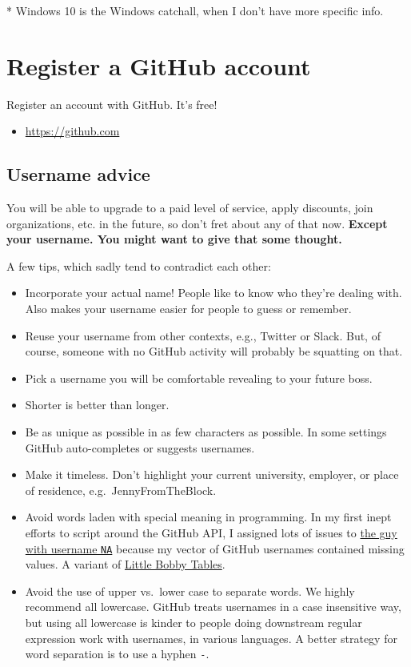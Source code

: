 \documentclass[
]{book}
\providecommand{\tightlist}{%
  \setlength{\itemsep}{0pt}\setlength{\parskip}{0pt}}
\begin{document}
* Windows 10 is the Windows catchall, when I don't have more specific info.

\chapter{Register a GitHub account}\label{github-acct}

Register an account with GitHub. It's free!

\begin{itemize}
\tightlist
\item
  \url{https://github.com}
\end{itemize}

\section{Username advice}\label{username-advice}

You will be able to upgrade to a paid level of service, apply discounts, join organizations, etc. in the future, so don't fret about any of that now. \textbf{Except your username. You might want to give that some thought.}

A few tips, which sadly tend to contradict each other:

\begin{itemize}
\tightlist
\item
  Incorporate your actual name! People like to know who they're dealing with. Also makes your username easier for people to guess or remember.
\item
  Reuse your username from other contexts, e.g., Twitter or Slack. But, of course, someone with no GitHub activity will probably be squatting on that.
\item
  Pick a username you will be comfortable revealing to your future boss.
\item
  Shorter is better than longer.
\item
  Be as unique as possible in as few characters as possible. In some settings GitHub auto-completes or suggests usernames.
\item
  Make it timeless. Don't highlight your current university, employer, or place of residence, e.g.~JennyFromTheBlock.
\item
  Avoid words laden with special meaning in programming. In my first inept efforts to script around the GitHub API, I assigned lots of issues to \href{https://github.com/na}{the guy with username \texttt{NA}} because my vector of GitHub usernames contained missing values. A variant of \href{https://xkcd.com/327/}{Little Bobby Tables}.
\item
  Avoid the use of upper vs.~lower case to separate words. We highly recommend all lowercase. GitHub treats usernames in a case insensitive way, but using all lowercase is kinder to people doing downstream regular expression work with usernames, in various languages. A better strategy for word separation is to use a hyphen \texttt{-}.
\end{itemize}
\end{document}
